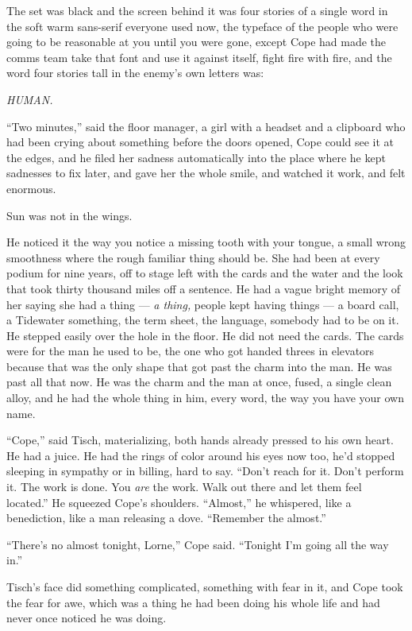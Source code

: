 \documentclass[11pt,openany]{book}
\begin{document}
The set was black and the screen behind it was four stories of a single word in the soft warm sans-serif everyone used now, the typeface of the people who were going to be reasonable at you until you were gone, except Cope had made the comms team take that font and use it against itself, fight fire with fire, and the word four stories tall in the enemy's own letters was:

\textit{HUMAN.}

``Two minutes,'' said the floor manager, a girl with a headset and a clipboard who had been crying about something before the doors opened, Cope could see it at the edges, and he filed her sadness automatically into the place where he kept sadnesses to fix later, and gave her the whole smile, and watched it work, and felt enormous.

Sun was not in the wings.

He noticed it the way you notice a missing tooth with your tongue, a small wrong smoothness where the rough familiar thing should be. She had been at every podium for nine years, off to stage left with the cards and the water and the look that took thirty thousand miles off a sentence. He had a vague bright memory of her saying she had a thing --- \textit{a thing,} people kept having things --- a board call, a Tidewater something, the term sheet, the language, somebody had to be on it. He stepped easily over the hole in the floor. He did not need the cards. The cards were for the man he used to be, the one who got handed threes in elevators because that was the only shape that got past the charm into the man. He was past all that now. He was the charm and the man at once, fused, a single clean alloy, and he had the whole thing in him, every word, the way you have your own name.

``Cope,'' said Tisch, materializing, both hands already pressed to his own heart. He had a juice. He had the rings of color around his eyes now too, he'd stopped sleeping in sympathy or in billing, hard to say. ``Don't reach for it. Don't perform it. The work is done. You \textit{are} the work. Walk out there and let them feel located.'' He squeezed Cope's shoulders. ``Almost,'' he whispered, like a benediction, like a man releasing a dove. ``Remember the almost.''

``There's no almost tonight, Lorne,'' Cope said. ``Tonight I'm going all the way in.''

Tisch's face did something complicated, something with fear in it, and Cope took the fear for awe, which was a thing he had been doing his whole life and had never once noticed he was doing.
\end{document}

